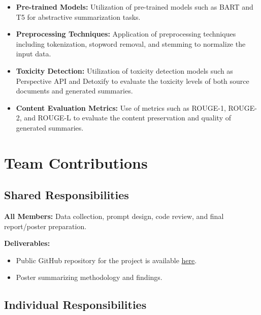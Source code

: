 \documentclass{article}
\begin{document}
\begin{itemize}
    \item \textbf{Pre-trained Models:} Utilization of pre-trained models such as BART \cite{lewis2019bart} and T5 \cite{raffel2020exploring} for abstractive summarization tasks.
    \item \textbf{Preprocessing Techniques:} Application of preprocessing techniques including tokenization, stopword removal, and stemming to normalize the input data.
    \item \textbf{Toxicity Detection:} Utilization of toxicity detection models such as Perspective API and Detoxify to evaluate the toxicity levels of both source documents and generated summaries.
    \item \textbf{Content Evaluation Metrics:} Use of metrics such as ROUGE-1, ROUGE-2, and ROUGE-L to evaluate the content preservation and quality of generated summaries.
\end{itemize}



\section{Team Contributions}

\subsection{Shared Responsibilities}

\textbf{All Members:} Data collection, prompt design, code review, and final report/poster preparation.

\noindent \textbf{Deliverables:}
\begin{itemize}
    \item Public GitHub repository for the project is available \href{https://github.com/arunimaCh29/Text-Summarisation-Eval#}{here}.
    \item Poster summarizing methodology and findings.
\end{itemize}

\subsection{Individual Responsibilities}
\end{document}
